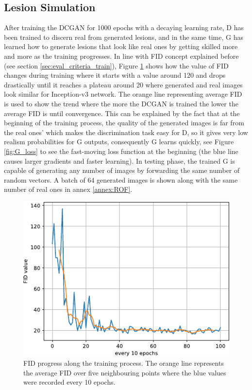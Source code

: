 \documentclass[final,3p,twocolumn,authoryear,sort&compress,times]{maia}
\begin{document}
\subsection{Lesion Simulation}
After training the DCGAN for 1000 epochs with a decaying learning rate, D has been trained to discern real from generated lesions, and in the same time, G has learned how to generate lesions that look like real ones by getting skilled more and more as the training progresses. In line with FID concept explained before (see section \ref{sec:eval_criteria_train}), Figure \ref{fig:FID_lesion_simulation} shows how the value of FID changes during training where it starts with a value around 120 and drops drastically until it reaches a plateau around 20 where generated and real images look similar for Inception-v3 network. The orange line representing average FID is used to show the trend where the more the DCGAN is trained the lower the average FID is until convergence. This can be explained by the fact that at the beginning of the training process, the quality of the generated images is far from the real ones' which makes the discrimination task easy for D, so it gives very low realism probabilities for G outputs, consequently G learns quickly, see Figure \ref{fig:G_loss} to see the fast-moving loss function at the beginning (the blue line causes larger gradients and faster learning). In testing phase, the trained G is capable of generating any number of images by forwarding the same number of random vectors. A batch of 64 generated images is shown along with the same number of real ones in annex \ref{annex:ROF}.

\begin{figure}[h]
    \centering
    \includegraphics{figures/FID.pdf}
    \caption{FID progress along the training process. The orange line represents the average FID over five neighbouring points where the blue values were recorded every 10 epochs.}
    \label{fig:FID_lesion_simulation}
\end{figure}
\end{document}
